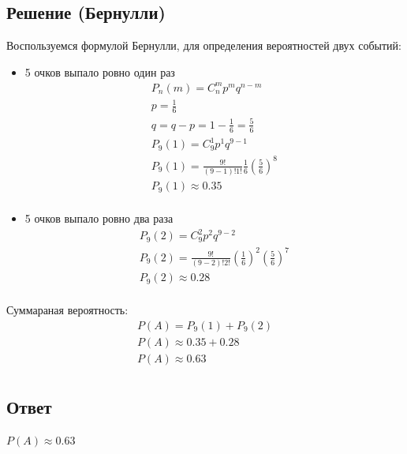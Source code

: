 \documentclass[12pt]{article}
\begin{document}
\subsection*{Решение (Бернулли)}
Воспользуемся формулой Бернулли, для определения вероятностей двух событий:
\begin{itemize}
	\item 5 очков выпало ровно один раз \\
	      \begin{gather*}
		      P_n(m) = C_n^mp^mq^{n-m} \\
		      p = \frac{1}{6} \\
		      q = q - p = 1 - \frac{1}{6} = \frac{5}{6} \\
		      P_9(1) = C_9^1p^1q^{9-1} \\
		      P_9(1) = \frac{9!}{(9 - 1)!1!}\frac{1}{6}\left(\frac{5}{6}\right)^8 \\
		      P_9(1) \approx 0.35 \\
	      \end{gather*}
	\item 5 очков выпало ровно два раза \\
	      \begin{gather*}
		      P_9(2) = C_9^2p^2q^{9-2} \\
		      P_9(2) = \frac{9!}{(9 - 2)!2!}\left(\frac{1}{6}\right)^2\left(\frac{5}{6}\right)^7 \\
		      P_9(2) \approx 0.28 \\
	      \end{gather*}
\end{itemize}

Суммараная вероятность:
\begin{gather*}
	P(A) = P_9(1) + P_9(2) \\
	P(A) \approx 0.35 + 0.28 \\
	P(A) \approx 0.63 \\
\end{gather*}
\subsection*{Ответ}
$P(A) \approx 0.63$
\end{document}
